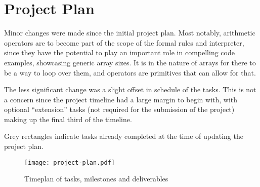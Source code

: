 \section{Project Plan}

Minor changes were made since the initial project plan. Most notably, arithmetic
operators are to become part of the scope of the formal rules and interpreter,
since they have the potential to play an important role in compelling code
examples, showcasing generic array sizes. It is in the nature of arrays for
there to be a way to loop over them, and operators are primitives that can allow
for that.

The less significant change was a slight offset in schedule of the tasks. This
is not a concern since the project timeline had a large margin to begin with,
with optional ``extension'' tasks (not required for the submission of the
project) making up the final third of the timeline.

Grey rectangles indicate tasks already completed at the time of updating the
project plan.

\begin{figure}[h]
    \texttt{[image: project-plan.pdf]}
    \caption{Timeplan of tasks, milestones and deliverables}
\end{figure}
